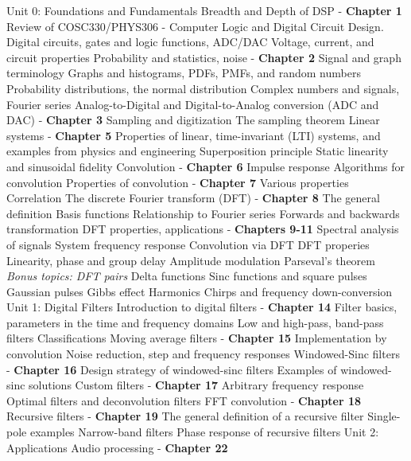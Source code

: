 \documentclass[10pt]{article}
\begin{document}
\begin{outline}[enumerate]
\1 Unit 0: Foundations and Fundamentals
\2 Breadth and Depth of DSP - \textbf{Chapter 1}
\3 Review of COSC330/PHYS306 - Computer Logic and Digital Circuit Design.  Digital circuits, gates and logic functions, ADC/DAC
\3 Voltage, current, and circuit properties
\2 Probability and statistics, noise - \textbf{Chapter 2}
\3 Signal and graph terminology
\3 Graphs and histograms, PDFs, PMFs, and random numbers
\3 Probability distributions, the normal distribution
\3 Complex numbers and signals, Fourier series
\2 Analog-to-Digital and Digital-to-Analog conversion (ADC and DAC) - \textbf{Chapter 3}
\3 Sampling and digitization
\3 The sampling theorem
\2 Linear systems - \textbf{Chapter 5}
\3 Properties of linear, time-invariant (LTI) systems, and examples from physics and engineering
\3 Superposition principle
\3 Static linearity and sinusoidal fidelity
\2 Convolution - \textbf{Chapter 6}
\3 Impulse response
\3 Algorithms for convolution
\2 Properties of convolution - \textbf{Chapter 7}
\3 Various properties
\3 Correlation
\2 The discrete Fourier transform (DFT) - \textbf{Chapter 8}
\3 The general definition
\4 Basis functions
\4 Relationship to Fourier series
\3 Forwards and backwards transformation
\2 DFT properties, applications - \textbf{Chapters 9-11}
\3 Spectral analysis of signals
\3 System frequency response
\3 Convolution via DFT
\3 DFT properies
\4 Linearity, phase and group delay
\4 Amplitude modulation
\4 Parseval's theorem
\3 \textit{Bonus topics: DFT pairs}
\4 Delta functions
\4 Sinc functions and square pulses
\4 Gaussian pulses
\4 Gibbs effect
\4 Harmonics
\4 Chirps and frequency down-conversion \\
\1 Unit 1: Digital Filters
\2 Introduction to digital filters - \textbf{Chapter 14}
\3 Filter basics, parameters in the time and frequency domains
\3 Low and high-pass, band-pass filters
\3 Classifications
\2 Moving average filters - \textbf{Chapter 15}
\3 Implementation by convolution
\3 Noise reduction, step and frequency responses
\2 Windowed-Sinc filters - \textbf{Chapter 16}
\3 Design strategy of windowed-sinc filters
\3 Examples of windowed-sinc solutions
\2 Custom filters - \textbf{Chapter 17}
\3 Arbitrary frequency response
\3 Optimal filters and deconvolution filters
\2 FFT convolution - \textbf{Chapter 18}
\2 Recursive filters - \textbf{Chapter 19}
\3 The general definition of a recursive filter
\3 Single-pole examples
\3 Narrow-band filters
\3 Phase response of recursive filters
\1 Unit 2: Applications
\2 Audio processing - \textbf{Chapter 22}

\end{outline}
\end{document}
